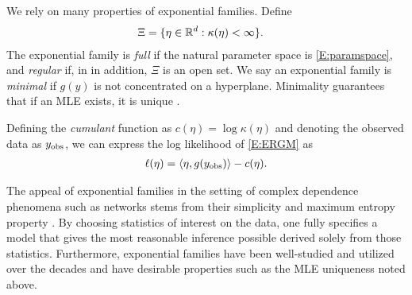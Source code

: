 We rely on many properties of exponential families.  Define 
\begin{align}
   \Xi &= \{ \eta \in {\mathbb R}^d : \kappa(\eta) < \infty \}.  \label{E:paramspace}
\end{align}
The exponential family is \emph{full} if the natural parameter  space is 
\eqref{E:paramspace}, and \emph{regular} if, in in addition, $\Xi$ is an open set.
We say an exponential family is \emph{minimal} if $g(y)$ is not concentrated on a 
hyperplane. Minimality guarantees that if an MLE exists, it is unique \citep{Geyer:gdor}.


Defining the \emph{cumulant} function as $c(\eta) = \log \kappa(\eta)$ and
denoting the observed data as $y_{\textrm{obs}}$, we can express 
the log likelihood of \eqref{E:ERGM} as
\begin{align}
	\ell( \eta ) = \langle  \eta, g(y_{\textrm{obs}}) \rangle - c( \eta). \label{E:loglike}
\end{align}

The appeal of exponential families in the setting of complex dependence phenomena such 
as networks stems from their simplicity and maximum entropy property 
\citep{Jaynes:1978,Geyer:1992}.
By choosing statistics of interest on the data, one fully specifies a model that gives 
the 
most reasonable inference possible derived solely from those statistics.  
Furthermore, exponential families have been 
well-studied \citep{Barndorff,Brown:1986} and utilized over the decades and have 
desirable properties such as the MLE uniqueness noted above.


